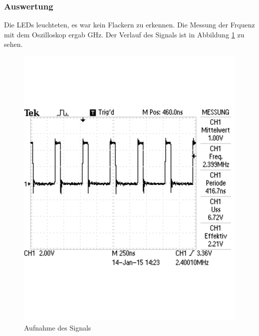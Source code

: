 \documentclass[12pt,a4paper]{article}
\begin{document}
\subsubsection*{Auswertung}

Die LEDs leuchteten, es war kein Flackern zu erkennen. Die Messung der Frquenz mit dem Oszilloskop ergab \unit[2,4]{GHz}. Der Verlauf des Signals ist in Abbildung \ref{fig:g_1} zu sehen.

\begin{figure}[H] 
  \centering 	
    \includegraphics[trim = 0mm 50mm 0mm 50mm, clip, scale = 0.4]{TEK0000.pdf}
  	\caption[Aufnahme des Signals]{Aufnahme des Signals} 
  \label{fig:g_1}
\end{figure}
\end{document}
